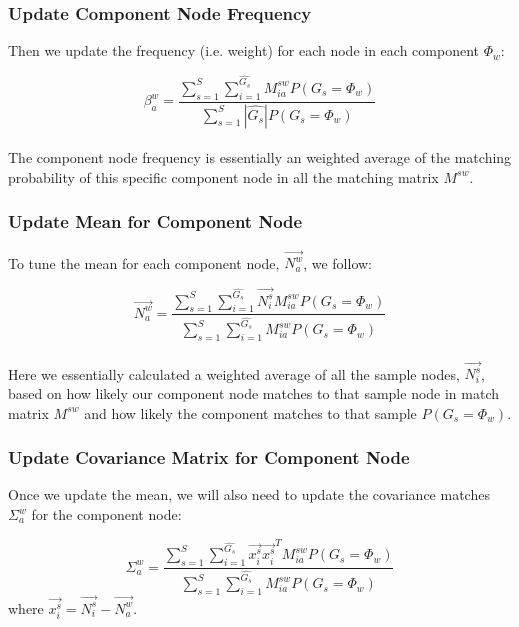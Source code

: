 \subsubsection{Update Component Node Frequency}

Then we update the frequency (i.e. weight) for each node in each component $\Phi_w$:

\begin{equation} 
\beta^w_a=\frac{\sum^S_{s=1}\sum^{\widehat{G_s}}_{i=1}M^{sw}_{ia}P(G_s=\Phi_w)}{\sum^S_{s=1}|\widehat{G_s}|P(G_s=\Phi_w)}
\end{equation}\\

The component node frequency is essentially an weighted average of the matching probability of this specific component node in all the matching matrix $M^{sw}$.\\

\subsubsection{Update Mean for Component Node}

To tune the mean for each component node, $\overrightarrow{N^w_a}$, we follow:

\begin{equation} 
\overrightarrow{N^w_a}=\frac{\sum^S_{s=1}\sum^{\widehat{G_s}}_{i=1}\overrightarrow{N^s_i}M^{sw}_{ia}P(G_s=\Phi_w)}{\sum^S_{s=1}\sum^{\widehat{G_s}}_{i=1}M^{sw}_{ia}P(G_s=\Phi_w)} \label{eq:nmean}
\end{equation}\\

Here we essentially calculated a weighted average of all the sample nodes, $\overrightarrow{N^s_i}$, based on how likely our component node matches to that sample node in match matrix $M^{sw}$ and how likely the component matches to that sample $P(G_s=\Phi_w)$.\\

\subsubsection{Update Covariance Matrix for Component Node}

Once we update the mean, we will also need to update the covariance matches $\Sigma^w_a$ for the component node:

\begin{equation} 
\Sigma^w_a=\frac{\sum^S_{s=1}\sum^{\widehat{G_s}}_{i=1}\overrightarrow{x^s_i}\overrightarrow{x^s_i}^TM^{sw}_{ia}P(G_s=\Phi_w)}{\sum^S_{s=1}\sum^{\widehat{G_s}}_{i=1}M^{sw}_{ia}P(G_s=\Phi_w)}
\end{equation}
where $\overrightarrow{x^s_i} = \overrightarrow{N^s_i} - \overrightarrow{N^w_a}$.\\

